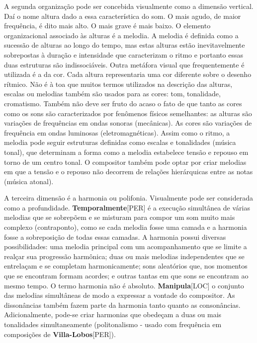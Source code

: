 \documentclass[a4paper,12pt]{article}
\begin{document}
A segunda organização pode ser concebida visualmente como a dimensão vertical. Daí o nome altura dado a essa característica do som. O mais agudo, de maior frequência, é dito mais alto. O mais grave é mais baixo. O elemento organizacional associado às alturas é a melodia. A melodia é definida como a sucessão de alturas ao longo do tempo, mas estas alturas estão inevitavelmente sobrepostas à duração e intensidade que caracterizam o ritmo e portanto essas duas estruturas são indissociáveis. Outra metáfora visual que frequentemente é utilizada é a da cor. Cada altura representaria uma cor diferente sobre o desenho rítmico. Não é à toa que muitos termos utilizados na descrição das alturas, escalas ou melodias também são usados para as cores: tom, tonalidade, cromatismo. Também não deve ser fruto do acaso o fato de que tanto as cores como os sons são caracterizados por fenômenos físicos semelhantes: as alturas são variações de frequências em ondas sonoras (mecânicas). As cores são variações de frequência em ondas luminosas (eletromagnéticas). Assim como o ritmo, a melodia pode seguir estruturas definidas como escalas e tonalidades (música tonal), que determinam a forma como a melodia estabelece tensão e repouso em torno de um centro tonal. O compositor também pode optar por criar melodias em que a tensão e o repouso não decorrem de relações hierárquicas entre as notas (música atonal).

A terceira dimensão é a harmonia ou polifonia. Visualmente pode ser considerada como a profundidade. \textbf{Temporalmente}\textsc{[PER]} é a execução simultânea de várias melodias que se sobrepõem e se misturam para compor um som muito mais complexo (contraponto), como se cada melodia fosse uma camada e a harmonia fosse a sobreposição de todas essas camadas. A harmonia possui diversas possibilidades: uma melodia principal com um acompanhamento que se limite a realçar sua progressão harmônica; duas ou mais melodias independentes que se entrelaçam e se completam harmonicamente; sons aleatórios que, nos momentos que se encontram formam acordes; e outras tantas em que sons se encontram ao mesmo tempo. O termo harmonia não é absoluto. \textbf{Manipula}\textsc{[LOC]} o conjunto das melodias simultâneas de modo a expressar a vontade do compositor. As dissonâncias também fazem parte da harmonia tanto quanto as consonâncias. Adicionalmente, pode-se criar harmonias que obedeçam a duas ou mais tonalidades simultaneamente (politonalismo - usado com frequência em composições de \textbf{Villa-Lobos}\textsc{[PER]}).
\end{document}
